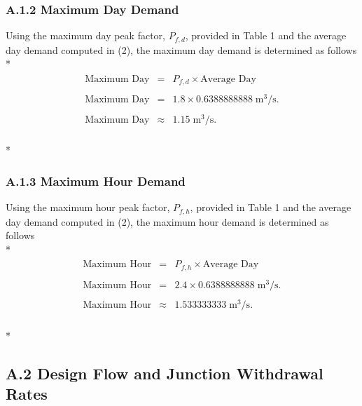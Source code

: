 \documentclass[]{article}
\begin{document}
\subsubsection{A.1.2 Maximum Day Demand}
Using the maximum day peak factor, $P_{f,d}$, provided in Table 1 and the average day demand computed in (2), the maximum day demand is determined as follows \\* 
\begin{align}
\begin{array}{rcl}
\text{Maximum Day} &=& P_{f,d} \times \text{Average Day} \\ \\  
\text{Maximum Day} &=& 1.8 \times 0.6388888888 \; \text{m}^3/\text{s}. \\ \\
\text{Maximum Day} &\approx& 1.15 \; \text{m}^3/\text{s}. 
\end{array}
\end{align} \\* 
\subsubsection{A.1.3 Maximum Hour Demand}
Using the maximum hour peak factor, $P_{f,h}$, provided in Table 1 and the average day demand computed in (2), the maximum hour demand is determined as follows \\* 
\begin{align}
\begin{array}{rcl}
\text{Maximum Hour} &=& P_{f,h} \times \text{Average Day} \\ \\  
\text{Maximum Hour} &=& 2.4 \times 0.6388888888 \; \text{m}^3/\text{s}. \\ \\
\text{Maximum Hour} &\approx& 1.533333333 \; \text{m}^3/\text{s}. 
\end{array}
\end{align} \\* 
\subsection{A.2 Design Flow and Junction Withdrawal Rates}
\end{document}
